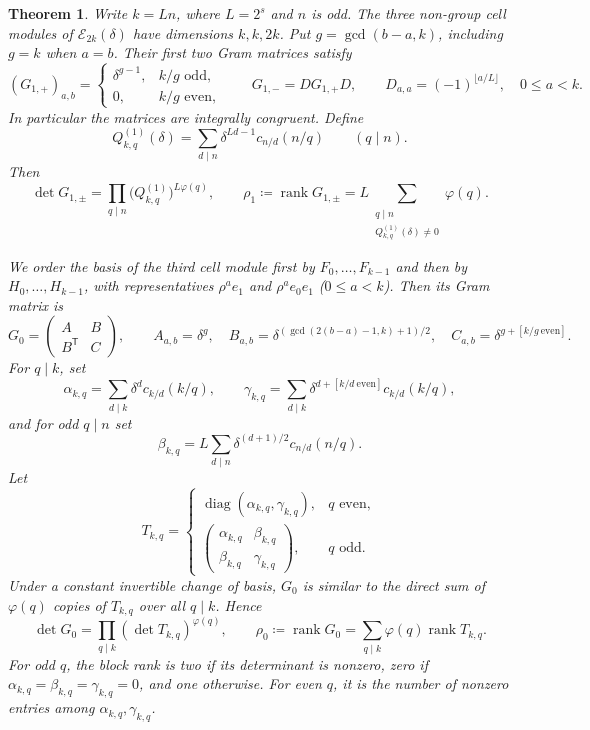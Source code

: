 \documentclass[11pt,a4paper]{amsart}
\newtheorem{theorem}{Theorem}[section]
\theoremstyle{uprightdefinition}
\theoremstyle{remark}\newtheorem{remark}[theorem]{Remark}
\begin{document}
\begin{theorem}
\label{thm:even-dihedral-spectrum}
Write $k=Ln$, where $L=2^s$ and $n$ is odd.  The three non-group cell
modules of $\mathcal E_{2k}(\delta)$ have dimensions $k,k,2k$.
Put $g=\gcd(b-a,k)$, including $g=k$ when $a=b$.
Their first two Gram matrices satisfy
\[
 (G_{1,+})_{a,b}=
 \begin{cases}\delta^{g-1},&k/g\text{ odd},\\0,&k/g\text{ even},\end{cases}
 \qquad
 G_{1,-}=D G_{1,+}D,\qquad
 D_{a,a}=(-1)^{\lfloor a/L\rfloor},\quad 0\le a<k.
\]
In particular the matrices are integrally congruent.  Define
\[
 Q_{k,q}^{(1)}(\delta)
   =\sum_{d\mid n}\delta^{Ld-1}c_{n/d}(n/q)\qquad(q\mid n).
\]
Then
\begin{equation}\label{eq:even-dihedral-G1}
 \det G_{1,\pm}=\prod_{q\mid n}
       \bigl(Q_{k,q}^{(1)}\bigr)^{L\varphi(q)},\qquad
 \rho_1\coloneqq\operatorname{rank}G_{1,\pm}
       =L\sum_{\substack{q\mid n\\Q_{k,q}^{(1)}(\delta)\ne0}}\varphi(q).
\end{equation}

We order the basis of the third cell module first by $F_0,\ldots,F_{k-1}$ and then by $H_0,\ldots,H_{k-1}$,
with representatives $\rho^a e_1$ and $\rho^a e_0e_1$ ($0\le a<k$).
Then its Gram matrix is
\[
 G_0=\begin{pmatrix}A&B\\B^{\mathsf T}&C\end{pmatrix},\qquad
 A_{a,b}=\delta^g,\quad
 B_{a,b}=\delta^{(\gcd(2(b-a)-1,k)+1)/2},\quad
 C_{a,b}=\delta^{g+[k/g\ \mathrm{even}]}.
\]
For $q\mid k$, set
\[
 \alpha_{k,q}=\sum_{d\mid k}\delta^d c_{k/d}(k/q),\qquad
 \gamma_{k,q}=\sum_{d\mid k}\delta^{d+[k/d\ \mathrm{even}]}c_{k/d}(k/q),
\]
and for odd $q\mid n$ set
\[
 \beta_{k,q}=L\sum_{d\mid n}\delta^{(d+1)/2}c_{n/d}(n/q).
\]
Let
\[
 T_{k,q}=\begin{cases}
  \operatorname{diag}(\alpha_{k,q},\gamma_{k,q}),&q\text{ even},\\
  \begin{pmatrix}\alpha_{k,q}&\beta_{k,q}\\
                  \beta_{k,q}&\gamma_{k,q}\end{pmatrix},&q\text{ odd}.
 \end{cases}
\]
Under a constant invertible change of basis, $G_0$ is similar to the direct sum
of $\varphi(q)$ copies of $T_{k,q}$ over all $q\mid k$.  Hence
\begin{equation}\label{eq:even-dihedral-G0}
 \det G_0=\prod_{q\mid k}(\det T_{k,q})^{\varphi(q)},\qquad
 \rho_0\coloneqq\operatorname{rank}G_0
       =\sum_{q\mid k}\varphi(q)\operatorname{rank}T_{k,q}.
\end{equation}
For odd $q$, the block rank is two if its determinant is nonzero, zero
if $\alpha_{k,q}=\beta_{k,q}=\gamma_{k,q}=0$, and one otherwise.
For even $q$, it is the number of nonzero entries among
$\alpha_{k,q},\gamma_{k,q}$.
\end{theorem}
\end{document}

